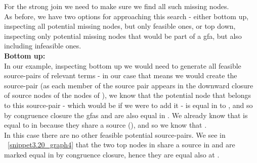 For the strong join we need to make sure we find all such missing nodes. \\
As before, we have two options for approaching this search - either bottom up, inspecting all potential missing nodes, but only feasible ones, or top down, inspecting only potential missing nodes that would be part of a gfa, but also including infeasible ones.\\
\textbf{Bottom up:}\\
In our example, inspecting bottom up we would need to generate all feasible source-pairs of relevant terms - in our case that means
we would create the source-pair  (as each member of the source pair appears in the downward closure of source nodes of the nodes of ), we know that the potential  node that belongs to this source-pair - which would be  if we were to add it - is equal in  to , and so by congruence closure the gfas 
 and  are also equal in .
We already know that  is equal to  in  because they share a source (), and so we know that .\\
In this case there are no other feasible potential source-pairs.
We see in ~\ref{snippet3.20_graph4} that the two top nodes in  share a source in  and are marked equal in  by 
congruence closure, hence they are equal also at .

